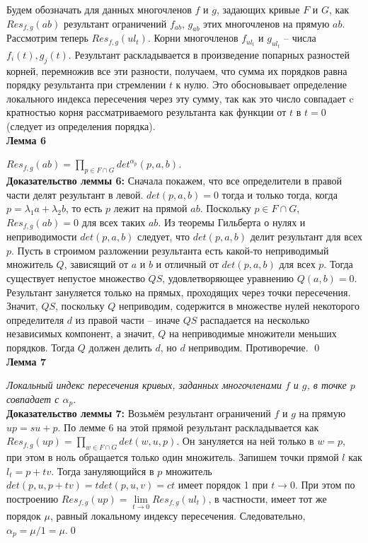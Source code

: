 \documentclass[a4paper, 12pt]{article}
\begin{document}
Будем обозначать для данных многочленов $f$ и $g$, задающих кривые $F$ и $G$, как $Res_{f,g}(ab)$ результант ограничений $f_{ab}$, $g_{ab}$ этих многочленов на прямую $ab$.\\

Рассмотрим теперь $Res_{f,g}(ul_t)$.  Корни многочленов $f_{ul_t}$ и $g_{ul_t}$ -- числа $f_i(t), g_j(t)$. Результант раскладывается в произведение попарных разностей корней, перемножив все эти разности, получаем, что сумма их порядков равна порядку результанта при стремлении $t$ к нулю.\newline
Это обосновывает определение локального индекса пересечения через эту сумму, так как это число совпадает c кратностью корня рассматриваемого результанта как функции от $t$ в $t=0$ (следует из определения порядка).\\

\textbf{Лемма 6}

\textit{$Res_{f,g}(ab) = \displaystyle\prod_{p \in F \cap G} det^{\alpha_p}(p,a,b)$.}\\

\textbf{Доказательство леммы 6:}\newline
Сначала покажем, что все определители в правой части делят результант в левой. $det(p,a,b) = 0$ тогда и только тогда, когда $p = \lambda_1 a + \lambda_2 b$, то есть $p$ лежит на прямой $ab$. Поскольку $p \in F \cap G$, $Res_{f,g}(ab)=0$ для всех таких $ab$. Из теоремы Гильберта о нулях и неприводимости $det(p,a,b)$ следует, что $det(p,a,b)$ делит результант для всех $p$.\newline
Пусть в строимом разложении результанта есть какой-то неприводимый множитель $Q$, зависящий от $a$ и $b$ и отличный от $det(p,a,b)$ для всех $p$. Тогда существует непустое множество $QS$, удовлетворяющее уравнению $Q(a,b)=0$. Результант зануляется только на прямых, проходящих через точки пересечения. Значит, $QS$, поскольку $Q$ неприводим, содержится в множестве нулей некоторого определителя $d$ из правой части -- иначе $QS$ распадается на несколько независимых компонент, а значит, $Q$ на неприводимые множители меньших порядков. Тогда $Q$ должен делить $d$, но $d$ неприводим. Противоречие.
\qed\\

\textbf{Лемма 7}

\textit{Локальный индекс пересечения кривых, заданных многочленами $f$ и $g$, в точке $p$ совпадает с $\alpha_p$.}\\

\textbf{Доказательство леммы 7:}\newline
Возьмём результант ограничений $f$ и $g$ на прямую $up={su + p}$. По лемме 6 на этой прямой результант раскладывается как $Res_{f,g}(up) = \displaystyle\prod_{w \in F \cap G} det(w,u,p)$. Он зануляется на ней только в $w=p$, при этом в ноль обращается только один множитель. Запишем точки прямой $l$ как $l_t = p + tv$. Тогда зануляющийся в $p$ множитель $det(p,u,p+tv) = tdet(p,u,v) = ct$ имеет порядок 1 при $t \rightarrow 0$. При этом по построению $Res_{f,g}(up) = \lim\limits_{t \to 0}Res_{f,g}(ul_t)$, в частности, имеет тот же порядок $\mu$, равный локальному индексу пересечения. Следовательно, $\alpha_p = \mu / 1 = \mu$.\qed\\
\end{document}
